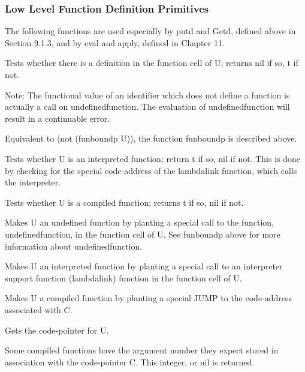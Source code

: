 \subsubsection{Low Level Function Definition Primitives}

  The  following functions are used especially by putd and Getd,
defined above in Section 9.1.3, and by eval and  apply,  defined
in Chapter 11.


{    Tests  whether there is a definition in the function cell of
    U; returns nil if so, t if not.

    Note:  The functional value of an identifier which does  not
    define  a  function is actually a call on undefinedfunction.
    The  evaluation  of  undefinedfunction  will  result  in   a
    continuable error.
}


{    Equivalent to (not (funboundp U)), the function funboundp is
    described above.
}

{    Tests whether U is an interpreted function;  return t if so,
    nil  if  not.  This  is  done  by  checking  for the special
    code-address of the lambdalink  function,  which  calls  the
    interpreter.
}

{    Tests  whether  U  is a compiled function;  returns t if so,
    nil if not.
}

{    Makes U an undefined function by planting a special call  to
    the  function, undefinedfunction, in the function cell of U.
    See   funboundp   above   for   more    information    about
    undefinedfunction.
}

{    Makes  U  an interpreted function by planting a special call
    to an interpreter support function (lambdalink) function  in
    the function cell of U.
}

{    Makes  U  a  compiled function by planting a special JUMP to
    the code-address associated with C.
}

{    Gets the code-pointer for U.
}

{    Some compiled functions have the argument number they expect
    stored in association with the code-pointer C. This integer,
    or nil is returned.
}
